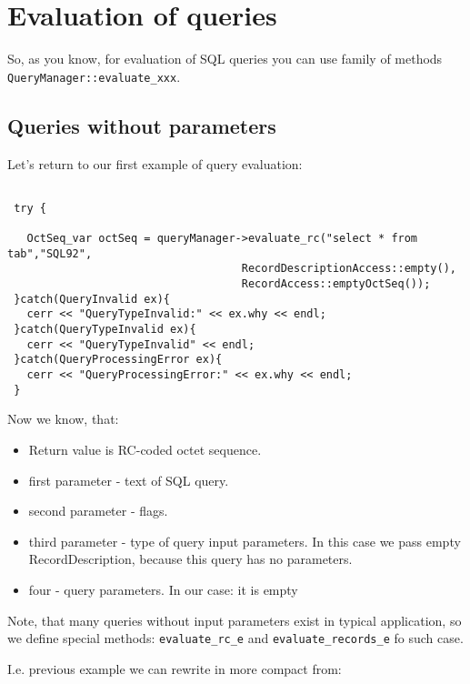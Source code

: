 \documentclass[10pt]{article}
\begin{document}
\section{ Evaluation of queries }

 So, as you know, for evaluation of SQL queries you can use family of
methods \verb|QueryManager::evaluate_xxx|.

\subsection{ Queries without parameters  }

 Let's return to our first example of query evaluation:

\begin{verbatim}

 try {

   OctSeq_var octSeq = queryManager->evaluate_rc("select * from tab","SQL92",
                                    RecordDescriptionAccess::empty(),
                                    RecordAccess::emptyOctSeq()); 
 }catch(QueryInvalid ex){
   cerr << "QueryTypeInvalid:" << ex.why << endl;
 }catch(QueryTypeInvalid ex){
   cerr << "QueryTypeInvalid" << endl;
 }catch(QueryProcessingError ex){
   cerr << "QueryProcessingError:" << ex.why << endl;
 }

\end{verbatim}

 Now we know, that:
\begin{itemize}
  \item Return value is RC-coded octet sequence.
  \item first parameter - text of SQL query.
  \item second parameter - flags. 
  \item third parameter - type of query input parameters. In this case we
 pass empty RecordDescription, because this query has no parameters.
  \item  four - query parameters. In our case: it is empty
\end{itemize}

 Note, that many queries without input parameters exist in typical application, so we define special methods: \verb|evaluate_rc_e| and \verb|evaluate_records_e| fo such case.

 I.e. previous example we can rewrite in more compact from:
\end{document}
